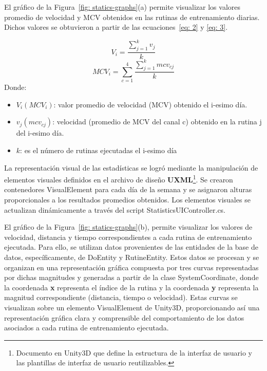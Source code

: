 \newpage
{}
El gráfico de la Figura~\ref{fig: statics-graphs}(a) permite visualizar los valores promedio de velocidad y MCV obtenidos en las rutinas de entrenamiento diarias. Dichos valores se obtuvieron a partir de las ecuaciones~\ref{eq: 2} y \ref{eq: 3}.    

\begin{equation}
    V_{i} = \frac{\sum_{j=1}^{k} v_{j}}{k}
    \label{eq: 2}
    \end{equation}
    \begin{equation}
    MCV_{i} = \sum_{c=1}^{4}\frac{\sum_{j=1}^{k} mcv_{c j}}{k}
    \label{eq: 3}
\end{equation}
Donde:
\begin{itemize}
    \item $V_{i} (MCV_{i})$: valor promedio de velocidad (MCV) obtenido el i-esimo día.
    \item $v_{j} (mcv_{cj})$: velocidad (promedio de MCV del canal c) obtenido en la rutina j del i-esimo día. 
    \item $k$: es el número de rutinas ejecutadas el i-esimo día 
\end{itemize}
La representación visual de las estadísticas se logró mediante la manipulación de elementos visuales definidos en el archivo de diseño \textbf{UXML}\footnote{Documento en Unity3D que define la estructura de la interfaz de usuario y las plantillas de interfaz de usuario reutilizables.}. Se crearon contenedores VisualElement para cada día de la semana y se asignaron alturas proporcionales a los resultados promedios obtenidos. Los elementos visuales se actualizan dinámicamente a través del script StatisticsUIController.cs.

El gráfico de la Figura~\ref{fig: statics-graphs}(b), permite visualizar los valores de velocidad, distancia y tiempo correspondientes a cada rutina de entrenamiento ejecutada. Para ello, se utilizan datos provenientes de las entidades de la base de datos, específicamente, de DoEntity y RutineEntity. Estos datos se procesan y se organizan en una representación gráfica compuesta por tres curvas representadas por dichas magnitudes y generadas a partir de la clase SystemCoordinate, donde la coordenada \textbf{x} representa el índice de la rutina y la coordenada \textbf{y} representa la magnitud correspondiente (distancia, tiempo o velocidad). Estas curvas  se visualizan sobre un elemento VisualElement de Unity3D, proporcionando así una representación gráfica clara y comprensible del comportamiento de los datos asociados a cada rutina de entrenamiento ejecutada.
    

